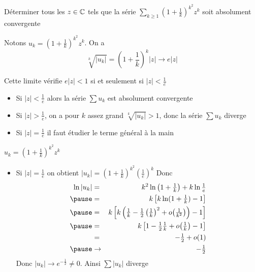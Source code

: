 \begin{frame}
\begin{exemple}
Déterminer tous les $z\in \mathbb{C}$ tels que la série  
$\sum_{k\ge1} \left( 1+\frac{1}{k}\right)^{k^2} z^k$ soit absolument convergente
\medskip

\pause
Notons $u_k =\left( 1+\frac{1}{k}\right)^{k^2} z^k$. \pause
On a $$\sqrt[k]{|u_k|}=\left( 1+\frac{1}{k}\right)^k |z| \to e|z|$$

\pause
Cette limite vérifie $e|z| < 1$ si et seulement si $|z|<\frac{1}{e}$

\begin{itemize}
  \item\pause Si $|z|<\frac{1}{e}$ alors la série $\sum u_k$ est absolument 
convergente
  
  \item\pause Si $|z|>\frac{1}{e}$, on a pour $k$ assez grand
  $\sqrt[k]{|u_k|}>1$, donc la série $\sum u_k$ diverge
  
  \item\pause Si $|z|=\frac{1}{e}$ il faut étudier le terme général à la main
\end{itemize}
\end{exemple}
\end{frame}


\begin{frame}
\begin{exemple}  
 $u_k =\left( 1+\frac{1}{k}\right)^{k^2} z^k$
\begin{itemize}
  \item Si $|z|=\frac{1}{e}$ \pause on obtient
  $|u_k|=\left(  1+\frac{1}{k}\right)^{k^2}\left(\frac{1}{e}\right)^k$
 \pause 
  Donc
  \begin{eqnarray*}
  \ln|u_k| 
  & = & k^2\ln\left(1+\tfrac{1}{k}\right)+k\ln \tfrac{1}{e} \\ \pause
  & = & k\left[k\ln (1+\tfrac{1}{k})-1\right] \\ \pause
  & = & k \left[ k\left(\tfrac{1}{k}-\tfrac{1}{2}\left( \tfrac{1}{k}\right)^2+
o\big( \tfrac{1}{k^2}\big) \right)-1\right] \\ \pause
  & = & k\left[1-\tfrac{1}{2}\tfrac{1}{k}+o\big( \tfrac{1}{k}\big) -1\right] \\
  & = & -\tfrac{1}{2} +o(1) \\ \pause
  & \to & -\tfrac{1}{2}
  \end{eqnarray*}
  \pause
Donc $|u_k| \to e^{-\frac{1}{2}}\neq 0$. Ainsi $\sum |u_k|$ diverge
\end{itemize}

\end{exemple}
\end{frame}

